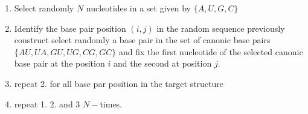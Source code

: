 \documentclass[english,12pt,a4paper]{article}
\theoremstyle{definition}
\begin{document}
\begin{enumerate}
	\item Select randomly $N$ nucleotides in a set given by $\big\{A, U, G, C \big\}$
	
	\item Identify the base pair position $(i,j)$ in the random sequence previously construct select randomly a base pair in the set of canonic base pairs $\big\{AU, UA, GU, UG, CG, GC \big\}$ and fix the first nucleotide of the selected canonic base pair at the position $i$ and the second at position $j$.
	
	\item  repeat 2. for all base par position in the target structure
	
	\item repeat 1. 2. and 3 $N-$times.
\end{enumerate}
\end{document}
